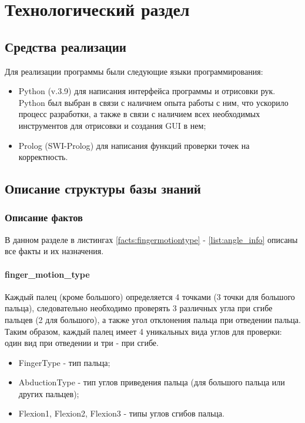 \chapter{Технологический раздел}


\section{Средства реализации}
\hspace{0.6cm} Для реализации программы были следующие языки программирования:
\begin{itemize}
	\item Python (v.3.9\cite{web:python}) для написания интерфейса программы и отрисовки рук. Python был выбран в связи с наличием опыта работы с ним, что ускорило процесс разработки, а также в связи с наличием всех необходимых инструментов для отрисовки и создания GUI в нем;
	\item Prolog (SWI-Prolog\cite{web:prolog}) для написания функций проверки точек на корректность.
\end{itemize}
 
\section{Описание структуры базы знаний}

\subsection{Описание фактов}
\hspace{0.6cm} В данном разделе в листингах \ref{facts:fingermotiontype} - \ref{list:angle_info} описаны все факты и их назначения.
\subsubsection{finger\_motion\_type}
\hspace{0.6cm} Каждый палец (кроме большого) определяется 4 точками (3 точки для большого пальца), следовательно необходимо проверять 3 различных угла при сгибе пальцев (2 для большого), а также угол отклонения пальца при отведении пальца. Таким образом, каждый палец имеет 4 уникальных вида углов для проверки: один вид при отведении и три - при сгибе. 

\begin{itemize}
	\item FingerType - тип пальца;
	\item AbductionType - тип углов приведения пальца (для большого пальца или других пальцев);
	\item Flexion1, Flexion2, Flexion3 - типы углов сгибов пальца.
\end{itemize}

